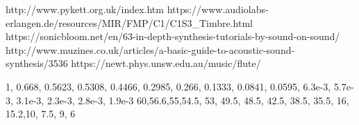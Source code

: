 


http://www.pykett.org.uk/index.htm
https://www.audiolabs-erlangen.de/resources/MIR/FMP/C1/C1S3_Timbre.html
https://sonicbloom.net/en/63-in-depth-synthesis-tutorials-by-sound-on-sound/
http://www.muzines.co.uk/articles/a-basic-guide-to-acoustic-sound-synthesis/3536
https://newt.phys.unsw.edu.au/music/flute/

1, 0.668, 0.5623, 0.5308, 0.4466, 0.2985, 0.266, 0.1333, 0.0841, 0.0595, 6.3e-3, 5.7e-3, 3.1e-3, 2.3e-3, 2.8e-3, 1.9e-3
60,56.6,55,54.5, 53, 49.5, 48.5, 42.5, 38.5, 35.5, 16, 15.2,10, 7.5, 9, 6

